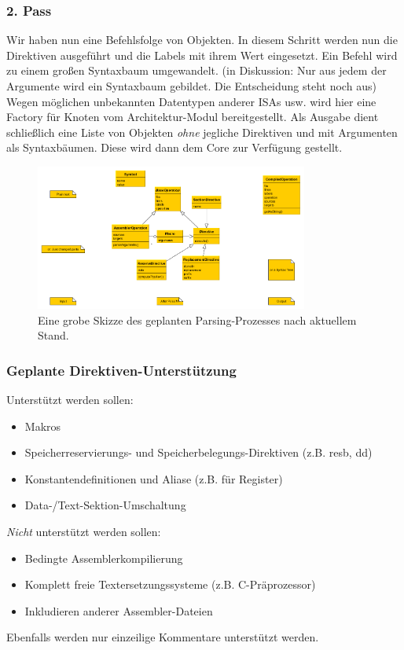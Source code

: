 \subsubsection{2. Pass}
Wir haben nun eine Befehlsfolge von Objekten. In diesem Schritt werden nun die Direktiven ausgeführt und die Labels mit ihrem Wert eingesetzt.
Ein Befehl wird zu einem großen Syntaxbaum umgewandelt. (in Diskussion: Nur aus jedem der Argumente wird ein Syntaxbaum gebildet. Die Entscheidung steht noch aus)
Wegen möglichen unbekannten Datentypen anderer ISAs usw. wird hier eine Factory für Knoten vom Architektur-Modul bereitgestellt.
Als Ausgabe dient schließlich eine Liste von Objekten \emph{ohne} jegliche Direktiven und mit Argumenten als Syntaxbäumen. Diese wird dann dem Core zur Verfügung gestellt.
\begin{figure}
\centering
\includegraphics[width=0.8\textwidth]{../parser/figures/process.png}
\caption{Eine grobe Skizze des geplanten Parsing-Prozesses nach aktuellem Stand.}
\end{figure}
\subsubsection{Geplante Direktiven-Unterstützung}
Unterstützt werden sollen:
\begin{itemize}
\item Makros
\item Speicherreservierungs- und Speicherbelegungs-Direktiven (z.B. resb, dd)
\item Konstantendefinitionen und Aliase (z.B. für Register)
\item Data-/Text-Sektion-Umschaltung
\end{itemize}
\emph{Nicht} unterstützt werden sollen:
\begin{itemize}
\item Bedingte Assemblerkompilierung
\item Komplett freie Textersetzungssysteme (z.B. C-Präprozessor)
\item Inkludieren anderer Assembler-Dateien
\end{itemize}
Ebenfalls werden nur einzeilige Kommentare unterstützt werden.
